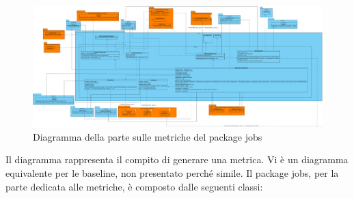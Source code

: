         \begin{figure}[htbp]
            \centering
            \includegraphics[width=\textwidth]{./img/DiagrammiClasse/metricJob.png}
            \caption[Diagramma di jobs - metric]{Diagramma della parte sulle metriche del package jobs}
        \end{figure}
        Il diagramma rappresenta il compito di generare una metrica. Vi è un diagramma equivalente per le baseline, non presentato
        perché simile. Il package jobs, per la parte dedicata alle metriche, è composto dalle seguenti classi:

